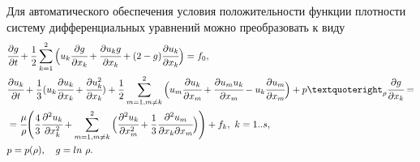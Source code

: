 

Для автоматического обеспечения условия положительности функции плотности систему дифференциальных уравнений можно преобразовать к виду
\begin{align*}
& \cfrac{\partial g}{\partial t} + \frac{1}{2}\sum_{k=1}^{2}\Big(u_k\cfrac{\partial g}{\partial x_k}+
  \cfrac{\partial u_k g}{\partial x_k} + (2-g)\cfrac{\partial u_k}{\partial x_k}\Big) = f_0,\\
& \cfrac{\partial u_k}{\partial t} + \frac{1}{3}(u_k\cfrac{\partial u_k}{\partial x_k} + 
  \cfrac{\partial u_k^2}{\partial x_k})
  + \frac{1}{2}\sum_{m=1,m\neq k}^{2}\Big( u_m\cfrac{\partial u_k}{\partial x_m}+
  \cfrac{\partial u_m u_k}{\partial x_m} - u_k\cfrac{\partial u_m}{\partial x_m}\Big)
  + p’_{\rho } \cfrac{\partial g}{\partial x_k} = \\
& = \cfrac{\mu}{\rho}\Bigg( \frac{4}{3} \cfrac{\partial^2 u_k}{\partial x_k^2} + 
  \sum_{m=1,m\neq k}^{2}\Big( \cfrac{\partial^2 u_k}{\partial x_m^2} + 
  \frac{1}{3} \cfrac{\partial^2 u_m}{\partial x_k \partial x_m} \Big)\Bigg) + f_k,\ k = 1..s,\\
& p = p(\rho), \quad g = ln\ \rho.
\end{align*}

